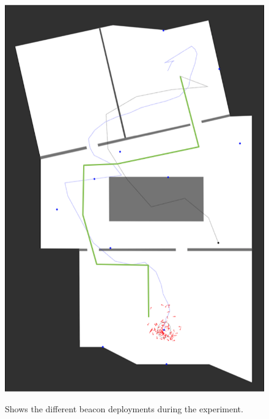 \begin{figure}
{		\includegraphics[height=0.45\textheight]{figures/eval_3_4}
		\label{fig:exp2_imgs_4}
	}
	\caption{Shows the different beacon deployments during the experiment.}
	\label{fig:exp2_imgs}
\end{figure}

